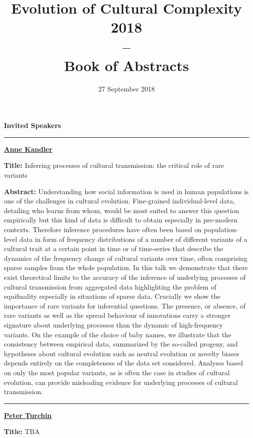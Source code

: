 \documentclass[]{article}
\date{}
\title{Evolution of Cultural Complexity 2018\\--\\Book of Abstracts}
\author{27 September 2018}
\begin{document}
\maketitle

\begin{center}
    \Large
    {\bf Invited Speakers\\}
    \rule{4cm}{.4pt}
\end{center}


{\bf { \href{../speakers\#ak}{Anne
Kandler} }}

\textbf{Title:} Inferring processes of cultural transmission: the
critical role of rare variants

\textbf{Abstract:} Understanding how social information is used in human
populations is one of the challenges in cultural evolution. Fine-grained
individual-level data, detailing who learns from whom, would be most
suited to answer this question empirically but this kind of data is
difficult to obtain especially in pre-modern contexts. Therefore
inference procedures have often been based on population-level data in
form of frequency distributions of a number of different variants of a
cultural trait at a certain point in time or of time-series that
describe the dynamics of the frequency change of cultural variants over
time, often comprising sparse samples from the whole population. In this
talk we demonstrate that there exist theoretical limits to the accuracy
of the inference of underlying processes of cultural transmission from
aggregated data highlighting the problem of equifinality especially in
situations of sparse data. Crucially we show the importance of rare
variants for inferential questions. The presence, or absence, of rare
variants as well as the spread behaviour of innovations carry a stronger
signature about underlying processes than the dynamic of high-frequency
variants. On the example of the choice of baby names, we illustrate that
the consistency between empirical data, summarized by the so-called
progeny, and hypotheses about cultural evolution such as neutral
evolution or novelty biases depends entirely on the completeness of the
data set considered. Analyses based on only the most popular variants,
as is often the case in studies of cultural evolution, can provide
misleading evidence for underlying processes of cultural transmission.

\rule{4cm}{.4pt}

{\bf { \href{../speakers\#ak}{Peter Turchin} }}

\textbf{Title:} TBA
\end{document}
